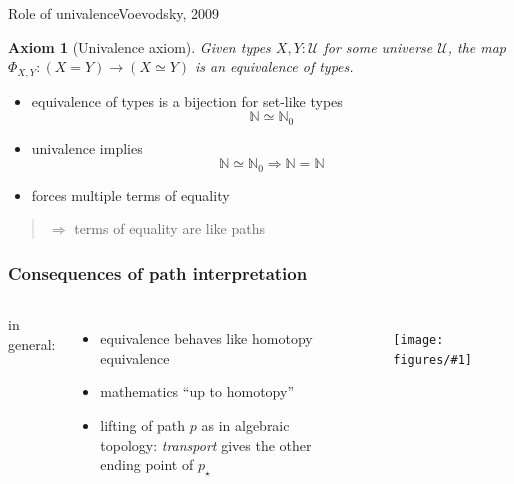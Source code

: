 \documentclass[english,draft]{beamer}
\newtheorem{axiom}[theorem]{Axiom}
\newcommand{\fig}[2]{
    \begin{figure}\begin{center}\texttt{[image: figures/\#1]}\caption{#2\label{#1}}\end{center}
    \end{figure}}
\newcommand{\tcol}[2]{
    \begin{columns}
        \column{.5\textwidth}
        #1
        \column{.5\textwidth}
        #2
    \end{columns}
}
\begin{document}

\begin{frame}{Role of univalence}{Voevodsky, 2009}

\begin{axiom}[Univalence axiom] 
 Given types $X,Y : \mathcal{U}$ for some universe $\mathcal{U}$, the map \(\Phi_{X,Y}: (X=Y) \rightarrow (X \simeq Y)\) is an equivalence of types. 
\end{axiom}

\begin{itemize}
    \item equivalence of types is a bijection for set-like types \[\mathbb{N} \simeq \mathbb{N}_0 \]
    \item univalence implies \[\mathbb{N} \simeq \mathbb{N}_0 \Rightarrow \mathbb{N} = \mathbb{N}\]

    \item forces multiple terms of equality
\end{itemize}

\pause
\begin{quotation}
$\Rightarrow$ terms of equality are like paths
\end{quotation}



\end{frame}

\begin{frame}[fragile]
    \frametitle{Consequences of path interpretation}
     
     
     \tcol{

        in general:
        \begin{itemize}
          \item equivalence behaves like homotopy equivalence
            \item mathematics ``up to homotopy''
            \item lifting of path $p$ as in  algebraic topology: \emph{transport} gives the other ending point of $p_\star$
        \end{itemize}
     }
     {
        \fig{cover}{}
     }     
\end{frame}
    
\end{document}
